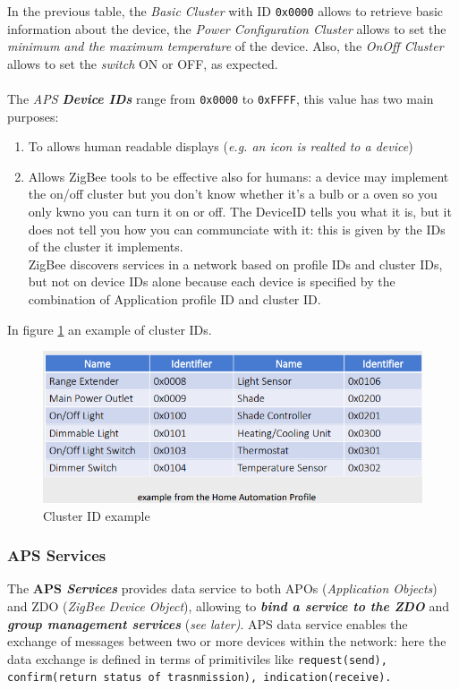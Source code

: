 \documentclass[10pt,a4paper]{report}
\theoremstyle{definition}
\begin{document}
In the previous table, the \textit{Basic Cluster} with ID \texttt{0x0000} allows to retrieve basic information about the device, the \textit{Power Configuration Cluster} allows to set the \textit{minimum and the maximum temperature} of the device. Also, the \textit{OnOff Cluster} allows to set the \textit{switch} ON or OFF, as expected.\\\\
The \textit{APS \textbf{Device IDs}} range from \texttt{0x0000} to \texttt{0xFFFF}, this value has two main purposes:
\begin{enumerate}
	\item 
	To allows human readable displays (\textit{e.g. an icon is realted to a device})
	\item 
	Allows ZigBee tools to be effective also for humans: a device may implement the on/off cluster but you don't know whether it's a bulb or a oven so you only kwno you can turn it on or off. The DeviceID tells you what it is, but it does not tell you how you can communciate with it: this is given by the IDs of the cluster it implements.\\
	ZigBee discovers services in a network based on profile IDs and cluster IDs, but not on device IDs alone because each device is specified by the combination of Application profile ID and cluster ID.
	
\end{enumerate}
In figure \ref{cluster-IDs} an example of cluster IDs.
\begin{figure}[h]
	\centering\includegraphics[scale=0.50]{images/Pasted image 20230311161838.png}
	\caption{Cluster ID example}
	\label{cluster-IDs}
\end{figure}
\subsubsection{APS Services}
The \textbf{APS \textit{\textbf{Services}}} provides data service to both APOs (\textit{Application Objects}) and ZDO (\textit{ZigBee Device Object}), allowing to \textit{\textbf{bind a service to the ZDO}} and \textit{\textbf{group management services}} (\textit{see later)}. APS data service enables the exchange of messages between two or more devices within the network: here the data exchange is defined in terms of primitiviles like \texttt{request(send), confirm(return status of trasnmission), indication(receive). }
\end{document}
